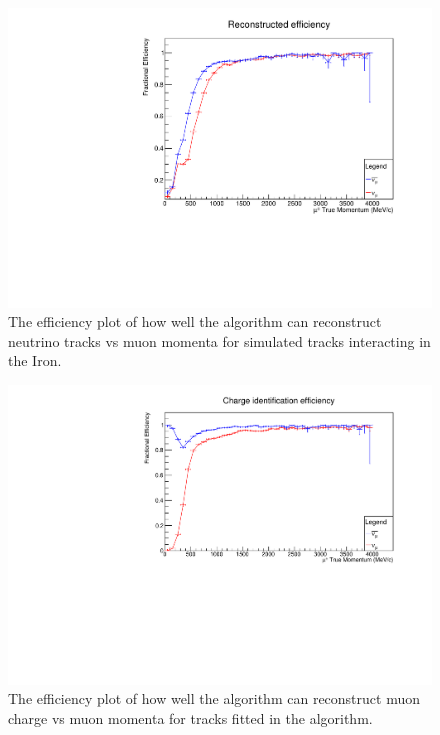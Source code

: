 \begin{figure}[h!]
\centering
\includegraphics[width=.9\textwidth]{figures/NeutrinoChap/Neutrino/T2KIronRecEff.pdf}
\caption{The efficiency plot of how well the algorithm can reconstruct neutrino tracks vs muon momenta for simulated tracks interacting in the Iron.}
\label{fig:IronMINDfitted}
\end{figure}

\begin{figure}[h!]
\centering
\includegraphics[width=.9\textwidth]{figures/NeutrinoChap/Neutrino/T2KIronChargeEff.pdf}
\caption{The efficiency plot of how well the algorithm can reconstruct muon charge vs muon momenta for tracks fitted in the algorithm.}
\label{fig:IronMINDfittedcharge}
\end{figure}

